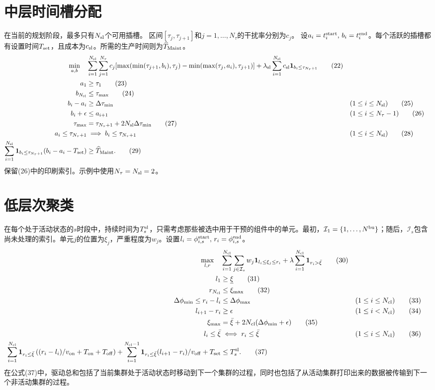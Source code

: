 \documentclass{article}
\begin{document}
\section*{中层时间槽分配}
在当前的规划阶段，最多只有\(N_{\rm sl}\)个可用插槽。  
区间\([\tau_j,\tau_{j+1}]\)和\(j=1,\ldots,N_\tau\)的干扰率分别为\(c_j\)。  
设\(a_i=t_i^{\rm start},\,b_i=t_i^{\rm end}\)。每个活跃的插槽都有设置时间\(T_{\rm set}\)，且成本为\(c_{\rm sl}\)。所需的生产时间则为\(\widehat T_{\rm Maint}\)。
\begin{align}
\min_{a,b}\quad&
 \sum_{i=1}^{N_{\rm sl}}\sum_{j=1}^{N_\tau}c_j
 [\max(\min(\tau_{j+1},b_i),\tau_j)-\min(\max(\tau_j,a_i),\tau_{j+1})]
 +\lambda_{\rm sl}\sum_{i=1}^{N_{\rm sl}}c_{\rm sl}{\bf1}_{b_i\le\tau_{N_\tau+1}}\tag{22}\\
a_1&\ge\tau_1\tag{23}\\
b_{N_{\rm sl}}&\le\tau_{\max}\tag{24}\\
b_i-a_i&\ge\Delta\tau_{\min} &&(1\le i\le N_{\rm sl})\tag{25}\\
b_i+\epsilon&\le a_{i+1} &&(1\le i\le N_\tau-1)\tag{26}\\
\tau_{\max}&=\tau_{N_\tau+1}+2N_{\rm sl}\Delta\tau_{\min}\tag{27}\\
a_i\le\tau_{N_\tau+1}&\implies b_i\le\tau_{N_\tau+1} &&(1\le i\le N_{\rm sl})\tag{28}\\
\sum_{i=1}^{N_{\rm sl}}{\bf1}_{b_i\le\tau_{N_\tau+1}}
 (b_i-a_i-T_{\rm set})&\ge\widehat T_{\rm Maint}.\tag{29}
\end{align}
保留(26)中的印刷索引。示例中使用\(N_\tau=N_{\rm sl}=2\)。
\section*{低层次聚类}
在每个处于活动状态的\(s\)时段中，持续时间为\(T_s^{\rm sl}\)，只需考虑那些被选中用于干预的组件中的单元。最初，\(\mathcal I_1=\{1,\ldots,N^{\rm bu}\}\)；随后，\(\mathcal I_s\)包含尚未处理的索引。单元\(j\)的位置为\(\xi_j\)，严重程度为\(w_j\)。设置\(l_i=\phi_{i,s}^{\rm start},\,r_i=\phi_{i,s}^{\rm end}\)。
\begin{align}
\max_{l,r}\quad&
\sum_{i=1}^{N_{\rm cl}}\sum_{j\in\mathcal I_s}w_j{\bf1}_{l_i\le\xi_j\le r_i}
 +\lambda\sum_{i=1}^{N_{\rm cl}}{\bf1}_{r_i>\bar\xi}\tag{30}\\
l_1&\ge\underline\xi\tag{31}\\
r_{N_{\rm cl}}&\le\xi_{\max}\tag{32}\\
\Delta\phi_{\min}\le r_i-l_i&\le\Delta\phi_{\max} &&(1\le i\le N_{\rm cl})\tag{33}\\
l_{i+1}-r_i&\ge\epsilon &&(1\le i<N_{\rm cl})\tag{34}\\
\xi_{\max}&=\bar\xi+2N_{\rm cl}(\Delta\phi_{\min}+\epsilon)\tag{35}\\
l_i\le\bar\xi&\iff r_i\le\bar\xi &&(1\le i\le N_{\rm cl})\tag{36}\\
\sum_{i=1}^{N_{\rm cl}}{\bf1}_{r_i\le\bar\xi}
 \left((r_i-l_i)/v_{\rm on}+T_{\rm on}+T_{\rm off}\right)
 +\sum_{i=1}^{N_{\rm cl}-1}{\bf1}_{r_i\le\bar\xi}
 (l_{i+1}-r_i)/v_{\rm off}+T_{\rm set}&\le T_s^{\rm sl}.\tag{37}
\end{align}
在公式(37)中，驱动总和包括了当前集群处于活动状态时移动到下一个集群的过程，同时也包括了从活动集群打印出来的数据被传输到下一个非活动集群的过程。
\end{document}
